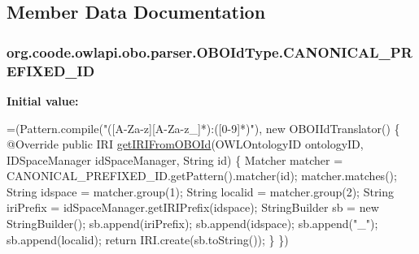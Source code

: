 \subsection{Member Data Documentation}
\hypertarget{enumorg_1_1coode_1_1owlapi_1_1obo_1_1parser_1_1_o_b_o_id_type_aa56819c29d7ba4b305d0677725b7ff8e}{
\subsubsection[{C\-A\-N\-O\-N\-I\-C\-A\-L\-\_\-\-P\-R\-E\-F\-I\-X\-E\-D\-\_\-\-I\-D}]{\setlength{\rightskip}{0pt plus 5cm}org.\-coode.\-owlapi.\-obo.\-parser.\-O\-B\-O\-Id\-Type.\-C\-A\-N\-O\-N\-I\-C\-A\-L\-\_\-\-P\-R\-E\-F\-I\-X\-E\-D\-\_\-\-I\-D}}\label{enumorg_1_1coode_1_1owlapi_1_1obo_1_1parser_1_1_o_b_o_id_type_aa56819c29d7ba4b305d0677725b7ff8e}
{\bfseries Initial value\-:}
\begin{DoxyCode}
=(Pattern.compile(\textcolor{stringliteral}{"([A-Za-z][A-Za-z\_]*):([0-9]*)"}), \textcolor{keyword}{new} OBOIIdTranslator() \{
        @Override
        \textcolor{keyword}{public} IRI \hyperlink{enumorg_1_1coode_1_1owlapi_1_1obo_1_1parser_1_1_o_b_o_id_type_a20861c514a5d45763ad0e6da65cd04c0}{getIRIFromOBOId}(OWLOntologyID ontologyID, IDSpaceManager idSpaceManager, 
      String \textcolor{keywordtype}{id}) \{
            Matcher matcher = CANONICAL\_PREFIXED\_ID.getPattern().matcher(\textcolor{keywordtype}{id});
            matcher.matches();
            String idspace = matcher.group(1);
            String localid = matcher.group(2);
            String iriPrefix = idSpaceManager.getIRIPrefix(idspace);
            StringBuilder sb = \textcolor{keyword}{new} StringBuilder();
            sb.append(iriPrefix);
            sb.append(idspace);
            sb.append(\textcolor{stringliteral}{"\_"});
            sb.append(localid);
            \textcolor{keywordflow}{return} IRI.create(sb.toString());
        \}
    \})
\end{DoxyCode}

